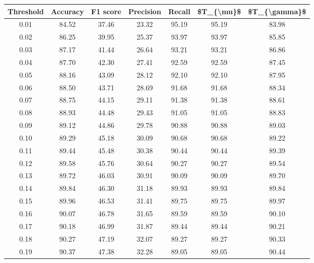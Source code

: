 \begin{tabular}{|c|c|c|c|c|c|c|}
\hline
 Threshold &  Accuracy &  F1 score &  Precision &  Recall &  \$T\_\{\textbackslash mu\}\$ &  \$T\_\{\textbackslash gamma\}\$ \\
\hline
      0.01 &     84.52 &     37.46 &      23.32 &   95.19 &      95.19 &         83.98 \\
      0.02 &     86.25 &     39.95 &      25.37 &   93.97 &      93.97 &         85.85 \\
      0.03 &     87.17 &     41.44 &      26.64 &   93.21 &      93.21 &         86.86 \\
      0.04 &     87.70 &     42.30 &      27.41 &   92.59 &      92.59 &         87.45 \\
      0.05 &     88.16 &     43.09 &      28.12 &   92.10 &      92.10 &         87.95 \\
      0.06 &     88.50 &     43.71 &      28.69 &   91.68 &      91.68 &         88.34 \\
      0.07 &     88.75 &     44.15 &      29.11 &   91.38 &      91.38 &         88.61 \\
      0.08 &     88.93 &     44.48 &      29.43 &   91.05 &      91.05 &         88.83 \\
      0.09 &     89.12 &     44.86 &      29.78 &   90.88 &      90.88 &         89.03 \\
      0.10 &     89.29 &     45.18 &      30.09 &   90.68 &      90.68 &         89.22 \\
      0.11 &     89.44 &     45.48 &      30.38 &   90.44 &      90.44 &         89.39 \\
      0.12 &     89.58 &     45.76 &      30.64 &   90.27 &      90.27 &         89.54 \\
      0.13 &     89.72 &     46.03 &      30.91 &   90.09 &      90.09 &         89.70 \\
      0.14 &     89.84 &     46.30 &      31.18 &   89.93 &      89.93 &         89.84 \\
      0.15 &     89.96 &     46.53 &      31.41 &   89.75 &      89.75 &         89.97 \\
      0.16 &     90.07 &     46.78 &      31.65 &   89.59 &      89.59 &         90.10 \\
      0.17 &     90.18 &     46.99 &      31.87 &   89.44 &      89.44 &         90.21 \\
      0.18 &     90.27 &     47.19 &      32.07 &   89.27 &      89.27 &         90.33 \\
      0.19 &     90.37 &     47.38 &      32.28 &   89.05 &      89.05 &         90.44 \\

\end{tabular}
